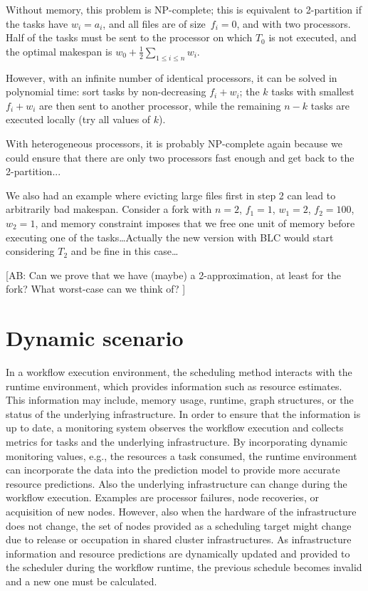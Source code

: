 \documentclass[conference]{IEEEtran}
\newcommand{\AB}[1]{{\color{purple}[AB: #1]}}
\begin{document}
    Without memory, this problem is NP-complete; this is equivalent
    to 2-partition if the tasks have $w_i=a_i$, and all files are of size~$f_i=0$,
    and with two processors. Half of the tasks must be sent to the processor
    on which $T_0$ is not executed, and the optimal makespan is
    $w_0+\frac{1}{2}\sum_{1\leq i \leq n} w_i$.

    However, with an infinite number of identical processors, it can be
    solved in polynomial time: sort tasks by non-decreasing $f_i+w_i$;
    the $k$ tasks with smallest $f_i+w_i$ are then sent to another processor,
    while the remaining $n-k$ tasks are executed locally (try all values of $k$).

    With heterogeneous processors, it is probably NP-complete again
    because we could ensure that there are only two processors fast enough
    and get back to the 2-partition...

    We also had an example where evicting large files first in step 2
    can lead to arbitrarily bad makespan. Consider a fork with $n=2$,
    $f_1=1$, $w_1=2$, $f_2=100$, $w_2=1$, and memory constraint
    imposes that we free one unit of memory before executing one
    of the tasks\ldots Actually the new version with BLC would start
    considering $T_2$ and be fine in this case\ldots


    \AB{Can we prove that we have (maybe) a 2-approximation,
        at least for the fork? What worst-case can we think of? }


    \section{Dynamic scenario}

    In a workflow execution environment, the scheduling method interacts with the runtime environment, which provides information such as resource estimates.
    This information may include, memory usage, runtime, graph structures, or the status of the underlying infrastructure.
    In order to ensure that the information is up to date, a monitoring system observes the workflow execution and collects metrics for tasks and the underlying infrastructure.
    By incorporating dynamic monitoring values, e.g., the resources a task consumed, the runtime environment can incorporate the data into the prediction model to provide more accurate resource predictions.
    Also the underlying infrastructure can change during the workflow execution.
    Examples are processor failures, node recoveries, or acquisition of new nodes.
    However, also when the hardware of the infrastructure does not change, the set of nodes provided as a scheduling target might change due to release or occupation in shared cluster infrastructures.
    As infrastructure information and resource predictions are dynamically updated and provided to the scheduler during the workflow runtime, the previous schedule becomes invalid and a new one must be calculated.
\end{document}
